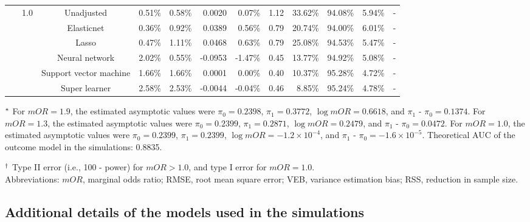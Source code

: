 \documentclass{article}
\begin{document}
\begin{center}
\begin{table}[!ht]
\begin{tabular*}{\textwidth}{@{\extracolsep\fill}c|c|c|rrrr|rrrrr}
        ~ & \multirow{6}{*}{1.0} & Unadjusted & 0.51\% & 0.58\% & 0.0020 & 0.07\% & 1.12 & 33.62\% & 94.08\% & 5.94\% & \multicolumn{1}{c}{-} \\ 
        ~ & ~ & Elasticnet & 0.36\% & 0.92\% & 0.0389 & 0.56\% & 0.79 & 20.74\% & 94.00\% & 6.01\% & \multicolumn{1}{c}{-} \\ 
        ~ & ~ & Lasso & 0.47\% & 1.11\% & 0.0468 & 0.63\% & 0.79 & 25.08\% & 94.53\% & 5.47\% & \multicolumn{1}{c}{-} \\ 
        ~ & ~ & Neural network & 2.02\% & 0.55\% & -0.0953 & -1.47\% & 0.45 & 13.77\% & 94.92\% & 5.08\% & \multicolumn{1}{c}{-} \\ 
        ~ & ~ & Support vector machine & 1.66\% & 1.66\% & 0.0001 & 0.00\% & 0.40 & 10.37\% & 95.28\% & 4.72\% & \multicolumn{1}{c}{-} \\ 
        ~ & ~ & Super learner & 2.58\% & 2.53\% & -0.0044 & -0.04\% & 0.46 & 8.85\% & 95.24\% & 4.78\% & \multicolumn{1}{c}{-} \\  
\bottomrule
\end{tabular*}
\begin{tablenotes}
\item[$^{\rm *}$] For $mOR=1.9$, the estimated asymptotic values were $\pi_0 = 0.2398$,  $\pi_1 = 0.3772$,  $\log mOR = 0.6618$,  and $\pi_1$ - $\pi_0 = 0.1374$.  For $mOR=1.3$,  the estimated asymptotic values were $\pi_0 = 0.2399$,  $\pi_1 = 0.2871$,  $\log mOR = 0.2479$,  and $\pi_1$ - $\pi_0 = 0.0472$. For $mOR=1.0$, the estimated asymptotic values were $\pi_0 = 0.2399$,  $\pi_1 = 0.2399$,  $\log mOR = -1.2\times 10^{-4}$,  and  $\pi_1$ - $\pi_0 = -1.6\times 10^{-5}$. Theoretical AUC of the outcome model in the simulations: 0.8835.
\item[$^{\rm \dagger}$]Type II error (i.e., 100 - power) for $mOR>1.0$, and type I error for $mOR=1.0$.\\
Abbreviations:  $mOR$, marginal odds ratio; RMSE, root mean square error; VEB, variance estimation bias; RSS,  reduction in sample size.
\end{tablenotes}
\end{table}
\end{center}


\clearpage

\newpage
\subsection*{Additional details of the models used in the simulations}\label{app1}
 
\end{document}
